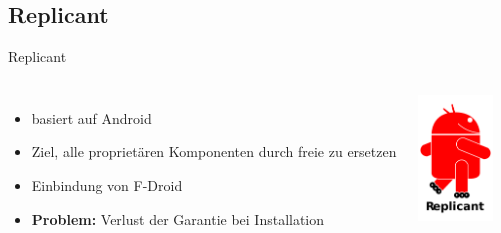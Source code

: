\documentclass[12pt]{beamer}
\begin{document}
\subsection{Replicant}
\begin{frame}{Replicant}

\begin{columns}


\column{6cm}
\begin{itemize}
\item basiert auf Android
\item Ziel, alle proprietären Komponenten durch freie zu ersetzen
\item Einbindung von F-Droid
\item \textbf{Problem:} Verlust der Garantie bei Installation
\end{itemize}

\column{5cm}


\begin{center}
\includegraphics[width=2cm]{img/Replicant_logo_alpha}
\par\end{center}

\end{columns}
\end{frame}
\end{document}
